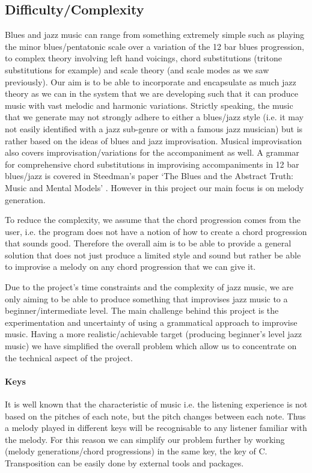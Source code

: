 \documentclass[pdftex,12pt,a4paper]{report}
\begin{document}
\subsection{Difficulty/Complexity}
Blues and jazz music can range from something extremely simple such as playing the minor blues/pentatonic scale over a variation of the 12 bar blues progression, to complex theory involving left hand voicings, chord substitutions (tritone substitutions for example) and scale theory (and scale modes as we saw previously). Our aim is to be able to incorporate and encapsulate as much jazz theory as we can in the system that we are developing such that it can produce music with vast melodic and harmonic variations. Strictly speaking, the music that we generate may not strongly adhere to either a blues/jazz style (i.e. it may not easily identified with a jazz sub-genre or with a famous jazz musician) but is rather based on the ideas of blues and jazz improvisation. Musical improvisation also covers improvisation/variations for the accompaniment as well. A grammar for comprehensive chord substitutions in improvising accompaniments in 12 bar blues/jazz is covered in Steedman's paper `The Blues and the Abstract Truth: Music and Mental Models' \cite{steedman96}. However in this project our main focus is on melody generation.

To reduce the complexity, we assume that the chord progression comes from the user, i.e. the program does not have a notion of how to create a chord progression that sounds good. Therefore the overall aim is to be able to provide a general solution that does not just produce a limited style and sound but rather be able to improvise a melody on any chord progression that we can give it.

Due to the project's time constraints and the complexity of jazz music, we are only aiming to be able to produce something that improvises jazz music to a beginner/intermediate level. The main challenge behind this project is the experimentation and uncertainty of using a grammatical approach to improvise music. Having a more realistic/achievable target (producing beginner's level jazz music) we have simplified the overall problem which allow us to concentrate on the technical aspect of the project.

\paragraph{Keys}
It is well known that the characteristic of music i.e. the listening experience is not based on the pitches of each note, but the pitch changes between each note. Thus a melody played in different keys will be recognisable to any listener familiar with the melody. For this reason we can simplify our problem further by working (melody generations/chord progressions) in the same key, the key of C. Transposition can be easily done by external tools and packages.
\end{document}
